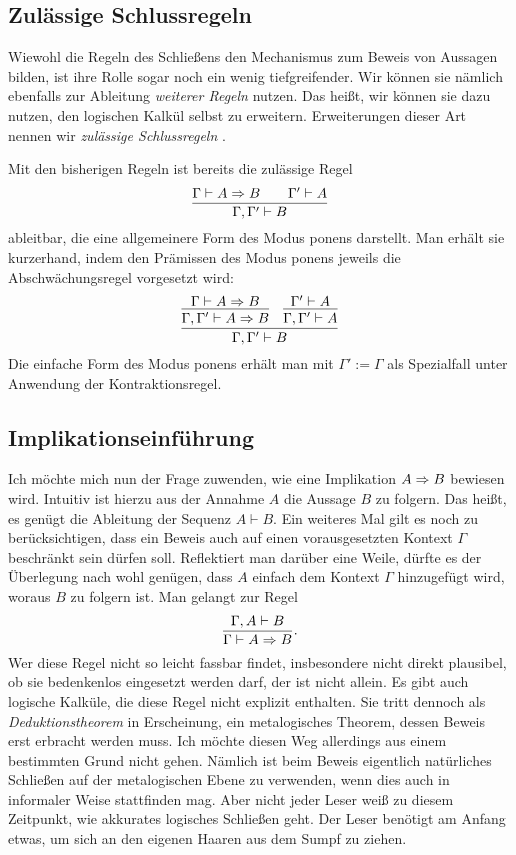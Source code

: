 \subsection{Zulässige Schlussregeln}

Wiewohl die Regeln des Schließens den Mechanismus zum Beweis
von Aussagen bilden, ist ihre Rolle sogar noch ein wenig tiefgreifender.
Wir können sie nämlich ebenfalls zur Ableitung \emph{weiterer Regeln}
nutzen. Das heißt, wir können sie dazu nutzen, den logischen Kalkül
selbst zu erweitern. Erweiterungen dieser Art nennen wir
\emph{zulässige Schlussregeln}%
.

Mit den bisherigen Regeln ist bereits die zulässige Regel
\[\dfrac{\Gamma\vdash A\Rightarrow B\qquad\Gamma'\vdash A}
{\Gamma,\Gamma'\vdash B}\]
ableitbar, die eine allgemeinere Form des Modus ponens darstellt. Man
erhält sie kurzerhand, indem den Prämissen des Modus
ponens jeweils die Abschwächungsregel vorgesetzt wird:
\[\infer{\Gamma,\Gamma'\vdash B}{
  \infer{\Gamma,\Gamma'\vdash A\cond B}{\Gamma\vdash A\cond B}
& \infer{\Gamma,\Gamma'\vdash A}{\Gamma'\vdash A}}
\]
Die einfache Form des Modus ponens erhält man mit $\Gamma':=\Gamma$ als
Spezialfall unter Anwendung der Kontraktionsregel.

\subsection{Implikationseinführung}

Ich möchte mich nun der Frage zuwenden, wie eine Implikation $A\Rightarrow B$
bewiesen wird. Intuitiv ist hierzu aus der Annahme $A$ die
Aussage $B$ zu folgern. Das heißt, es genügt die Ableitung
der Sequenz $A\vdash B$. Ein weiteres Mal gilt es noch zu
berücksichtigen, dass ein Beweis auch auf einen vorausgesetzten
Kontext $\Gamma$ beschränkt sein dürfen soll. Reflektiert man darüber
eine Weile, dürfte es der Überlegung nach wohl genügen, dass $A$
einfach dem Kontext $\Gamma$ hinzugefügt wird, woraus $B$ zu folgern
ist. Man gelangt zur Regel
\[\dfrac{\Gamma,A\vdash B}{\Gamma\vdash A\Rightarrow B}.\]
Wer diese Regel nicht so leicht fassbar findet, insbesondere nicht
direkt plausibel, ob sie bedenkenlos eingesetzt werden darf, der
ist nicht allein. Es gibt auch logische Kalküle, die diese Regel nicht
explizit enthalten. Sie tritt dennoch als \emph{Deduktionstheorem} in
Erscheinung, ein metalogisches Theorem, dessen Beweis erst erbracht
werden muss. Ich möchte diesen Weg allerdings aus einem bestimmten Grund
nicht gehen. Nämlich ist beim Beweis eigentlich natürliches Schließen
auf der metalogischen Ebene zu verwenden, wenn dies auch in informaler
Weise stattfinden mag. Aber nicht jeder Leser weiß zu diesem Zeitpunkt,
wie akkurates logisches Schließen geht. Der Leser benötigt am Anfang
etwas, um sich an den eigenen Haaren aus dem Sumpf zu ziehen.

